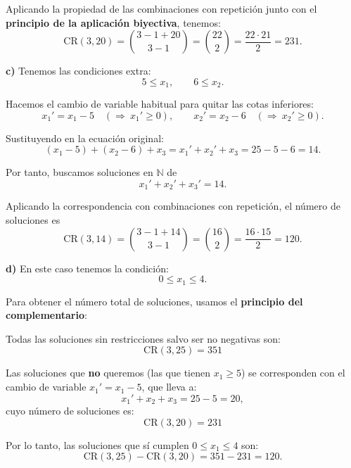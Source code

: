 \documentclass[a4paper,12pt]{article}
\begin{document}
\begin{ejercicio}[title=Ejercicio 31]

Aplicando la propiedad de las combinaciones con repetición junto con el \textbf{principio de la aplicación biyectiva}, tenemos:
\[
\mathrm{CR}(3,20)
= \binom{3-1+20}{3-1}
= \binom{22}{2}
= \frac{22\cdot 21}{2}
= \boxed{231}.
\]

\textbf{c)}  
Tenemos las condiciones extra:
\[
5 \le x_1,\qquad 6 \le x_2.
\]

Hacemos el cambio de variable habitual para quitar las cotas inferiores:
\[
x_1' = x_1 - 5 \quad(\Rightarrow\ x_1'\ge 0),\qquad
x_2' = x_2 - 6 \quad(\Rightarrow\ x_2'\ge 0).
\]

Sustituyendo en la ecuación original:
\[
(x_1-5) + (x_2-6) + x_3 = x_1' + x_2' + x_3 = 25 - 5 - 6 = 14.
\]

Por tanto, buscamos soluciones en $\mathbb{N}$ de
\[
x_1' + x_2' + x_3' = 14.
\]

Aplicando la correspondencia con combinaciones con repetición, el número de soluciones es
\[
\mathrm{CR}(3,14)=\binom{3-1+14}{3-1}=\binom{16}{2}=\frac{16\cdot 15}{2}=\boxed{120}.
\]

\textbf{d)}  
En este caso tenemos la condición:
\[
0 \le x_1 \le 4.
\]

\vspace{0.5em}

Para obtener el número total de soluciones, usamos el \textbf{principio del complementario}:

Todas las soluciones sin restricciones salvo ser no negativas son:
\[
\mathrm{CR}(3,25) = 351
\]

Las soluciones que \textbf{no} queremos (las que tienen \(x_1 \ge 5\)) se corresponden con el cambio de variable \(x_1' = x_1 - 5\), que lleva a:
\[
x_1' + x_2 + x_3 = 25 - 5 = 20,
\]
cuyo número de soluciones es:
\[
\mathrm{CR}(3,20) = 231
\]

Por lo tanto, las soluciones que sí cumplen \(0 \le x_1 \le 4\) son:
\[
\mathrm{CR}(3,25) - \mathrm{CR}(3,20) = 351 - 231 = \boxed{120}.
\]

\end{ejercicio}
\end{document}
